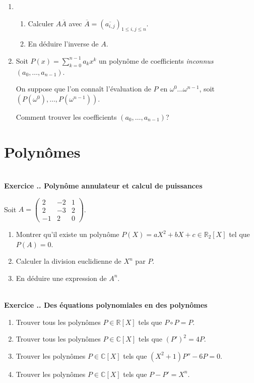 \documentclass{article}
\newcommand{\mb}[1]{\mathbb{#1}}
\newcounter{exo}
\newcommand{\exercice}[1][\null]{\textbf{\\ Exercice \thesection.\theexo. #1} \addtocounter{exo}{1}}
\begin{document}
\begin{enumerate}

\item \begin{enumerate}

\item Calculer $A \overline{A}$ avec $\overline{A} = (\overline{a_{i,j}})_{1 \le i,j \le n}$.

\item En déduire l'inverse de $A$.

\end{enumerate}

\item Soit $ P(x) =  \sum_{k=0}^{n-1} a_k x^k$ un polynôme de coefficients \emph{inconnus} $(a_0, \dots, a_{n-1})$.

On suppose que l'on connaît l'évaluation de $P$ en $\omega^0 \dots \omega^{n-1}$, soit $(P(\omega^0), \dots, P(\omega^{n-1}))$.

Comment trouver les coefficients $(a_0, \dots, a_{n-1})$?

\end{enumerate}


\section{Polynômes}


\exercice[Polynôme annulateur et calcul de puissances]

Soit $A = \begin{pmatrix} 2 & -2 & 1 \\ 2& -3& 2 \\ -1 & 2 & 0 \end{pmatrix}$.

\begin{enumerate}

\item Montrer qu'il existe un polynôme $P(X) = a X^2 + b X + c \in \mb{R}_2[X]$ tel que $P(A) = 0$.

\item Calculer la division euclidienne de $X^n$ par $P$.

\item En déduire une expression de $A^n$.

\end{enumerate}


\exercice[Des équations polynomiales en des polynômes]

\begin{enumerate}

\item Trouver tous les polynômes $P \in \mb{R}[X]$ tels que $P \circ P = P$.

\item Trouver tous les polynômes $P \in \mb{C}[X]$ tels que $(P')^2 = 4P$.

\item Trouver les polynômes $P \in \mb{C}[X]$ tels que $(X^2+1)P'' - 6P =0$.

\item Trouver les polynômes $P \in \mb{C}[X]$ tels que $P - P' = X^n$.

\end{enumerate}
\end{document}
